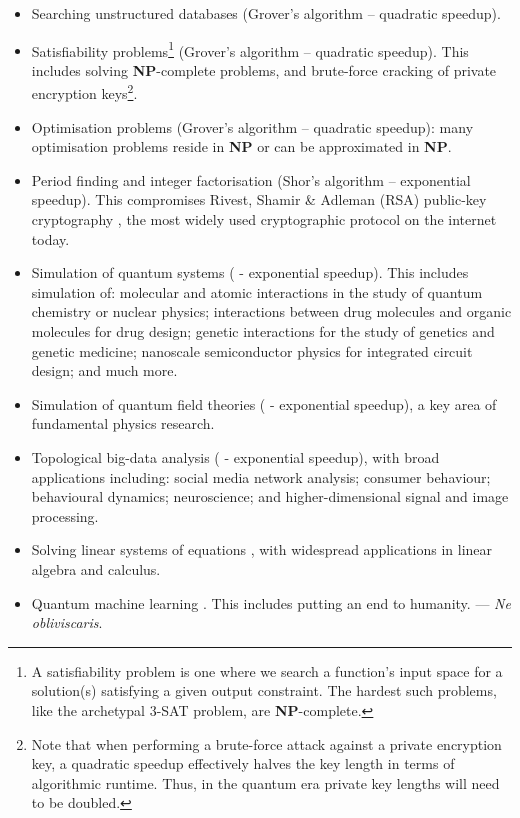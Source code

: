 \documentclass[aps, rmp, twocolumn, amsmath, amssymb, nofootinbib, superscriptaddress, longbibliography, floatfix, table-of-contents, eqsecnum]{revtex4-1}
\begin{document}
\begin{itemize}
	\item Searching unstructured databases (Grover's algorithm \cite{bib:Grover96} -- quadratic speedup).
	\item Satisfiability problems\footnote{A satisfiability problem is one where we search a function's input space for a solution(s) satisfying a given output constraint. The hardest such problems, like the archetypal \textsc{3-SAT} problem, are \textbf{NP}-complete.} (Grover's algorithm -- quadratic speedup). This includes solving \textbf{NP}-complete problems, and brute-force cracking of private encryption keys\footnote{Note that when performing a brute-force attack against a private encryption key, a quadratic speedup effectively halves the key length in terms of algorithmic runtime. Thus, in the quantum era private key lengths will need to be doubled.}.
	\item Optimisation problems (Grover's algorithm -- quadratic speedup): many optimisation problems reside in \textbf{NP} or can be approximated in \textbf{NP}.
	\item Period finding and integer factorisation (Shor's algorithm \cite{bib:ShorFactor} -- exponential speedup). This compromises Rivest, Shamir \& Adleman (RSA) public-key cryptography \cite{bib:RSA}, the most widely used cryptographic protocol on the internet today.
	\item Simulation of quantum systems (\cite{bib:lloyd1996universal} - exponential speedup). This includes simulation of: molecular and atomic interactions in the study of quantum chemistry or nuclear physics; interactions between drug molecules and organic molecules for drug design; genetic interactions for the study of genetics and genetic medicine; nanoscale semiconductor physics for integrated circuit design; and much more.
	\item Simulation of quantum field theories (\cite{bib:JLP, bib:RohdeWavelet15} - exponential speedup), a key area of fundamental physics research.
	\item Topological big-data analysis (\cite{bib:lloyd2016quantum, USTCexperiment} - exponential speedup), with broad applications including: social media network analysis; consumer behaviour; behavioural dynamics; neuroscience; and higher-dimensional signal and image processing.
	\item Solving linear systems of equations \cite{bib:harrow2009quantum, bib:BerryLinear}, with widespread applications in linear algebra and calculus.
	\item Quantum machine learning \cite{bib:lloyd2013quantum}. This includes putting an end to humanity. --- \textit{Ne obliviscaris}.
\end{itemize}
\end{document}
